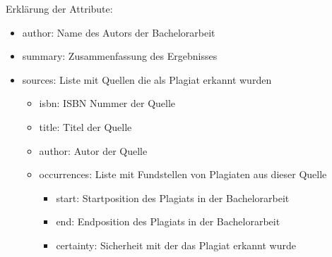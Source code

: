 Erklärung der Attribute:
\begin{itemize}
    \item author: Name des Autors der Bachelorarbeit
    \item summary: Zusammenfassung des Ergebnisses
    \item sources: Liste mit Quellen die als Plagiat erkannt wurden
    \begin{itemize}
        \item isbn: ISBN Nummer der Quelle
        \item title: Titel der Quelle
        \item author: Autor der Quelle
        \item occurrences: Liste mit Fundstellen von Plagiaten aus dieser Quelle
        \begin{itemize}
            \item start: Startposition des Plagiats in der Bachelorarbeit
            \item end: Endposition des Plagiats in der Bachelorarbeit
            \item certainty: Sicherheit mit der das Plagiat erkannt wurde
        \end{itemize}
    \end{itemize}
\end{itemize}